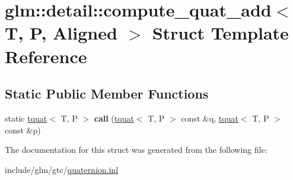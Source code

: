 \hypertarget{structglm_1_1detail_1_1compute__quat__add}{}\section{glm\+:\+:detail\+:\+:compute\+\_\+quat\+\_\+add$<$ T, P, Aligned $>$ Struct Template Reference}
\label{structglm_1_1detail_1_1compute__quat__add}
\subsection*{Static Public Member Functions}
\begin{DoxyCompactItemize}
\item 
\mbox{\label{structglm_1_1detail_1_1compute__quat__add_afa9fcc5ea4b99f8c5d5f5c0f81b833e2}} 
static \hyperlink{structglm_1_1tquat}{tquat}$<$ T, P $>$ {\bfseries call} (\hyperlink{structglm_1_1tquat}{tquat}$<$ T, P $>$ const \&q, \hyperlink{structglm_1_1tquat}{tquat}$<$ T, P $>$ const \&p)
\end{DoxyCompactItemize}


The documentation for this struct was generated from the following file\+:\begin{DoxyCompactItemize}
\item 
include/glm/gtc/\hyperlink{gtc_2quaternion_8inl}{quaternion.\+inl}\end{DoxyCompactItemize}
